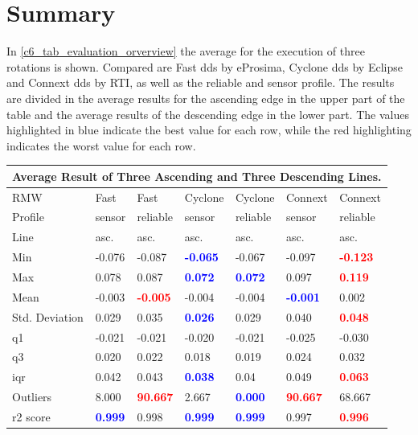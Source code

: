 \section{Summary}
In \autoref{c6_tab_evaluation_orverview} the average for the execution of three rotations is shown. Compared are Fast \gls{dds} by eProsima, Cyclone \gls{dds} by Eclipse and Connext \gls{dds} by RTI, as well as the reliable and sensor profile. The results are divided in the average results for the ascending edge in the upper part of the table and the average results of the descending edge in the lower part. The values highlighted in blue indicate the best value for each row, while the red highlighting indicates the worst value for each row.
\begin{table}[htbp]
\begin{tabular}{|l|ll|ll|ll|}
\toprule
\multicolumn{7}{|c|}{Average Result of Three Ascending and Three Descending Lines.} \\
\toprule
 RMW & Fast & Fast  & Cyclone & Cyclone & Connext & Connext \\
\midrule
Profile & sensor & reliable & sensor & reliable & sensor & reliable \\
\midrule
Line & asc. & asc. & asc. & asc. & asc. & asc. \\
Min & -0.076 & -0.087 & \textcolor{blue}{\textbf{-0.065}} & -0.067 & -0.097 & \textcolor{red}{\textbf{-0.123}} \\
Max & 0.078 & 0.087 & \textcolor{blue}{\textbf{0.072}} & \textcolor{blue}{\textbf{0.072}} & 0.097 & \textcolor{red}{\textbf{0.119}} \\
Mean & -0.003 & \textcolor{red}{\textbf{-0.005}} & -0.004 & -0.004 & \textcolor{blue}{\textbf{-0.001}} & 0.002 \\
Std. Deviation & 0.029 & 0.035 & \textcolor{blue}{\textbf{0.026}} & 0.029 & 0.040 & \textcolor{red}{\textbf{0.048}} \\
\gls{q1} & -0.021 & -0.021 & -0.020 & -0.021 & -0.025 & -0.030 \\
\gls{q3} & 0.020 & 0.022 & 0.018 & 0.019 & 0.024 & 0.032 \\
\gls{iqr} & 0.042 & 0.043 & \textcolor{blue}{\textbf{0.038}} & 0.04 & 0.049 & \textcolor{red}{\textbf{0.063}} \\
Outliers & 8.000 & \textcolor{red}{\textbf{90.667}} & 2.667 & \textcolor{blue}{\textbf{0.000}} & \textcolor{red}{\textbf{90.667}} & 68.667 \\
\gls{r2} score & \textcolor{blue}{\textbf{0.999}} & 0.998 & \textcolor{blue}{\textbf{0.999}} & \textcolor{blue}{\textbf{0.999}} & 0.997 & \textcolor{red}{\textbf{0.996}} \\

\end{tabular}
\end{table}
